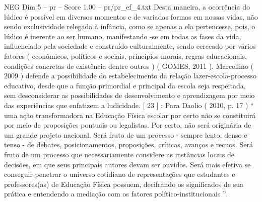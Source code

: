 \begin{textsample}{NEG Dim 5 – pr – Score 1.00 – pr/pr\_ef\_4.txt}
Desta maneira, a ocorrência do lúdico é possível em diversos momentos e de variadas formas em nossas vidas, não sendo exclusividade relegada à infância, como se apenas a ela pertencesse, pois, o lúdico é inerente ao ser humano, manifestando -se em todas as fases da vida, influenciado pela sociedade e construído culturalmente, sendo cerceado por vários fatores ( econômicos, políticos e sociais, princípios morais, regras educacionais, condições concretas de existência dentre outros ) ( GOMES, 2011 ).
Marcellino ( 2009 ) defende a possibilidade do estabelecimento da relação lazer-escola-processo educativo, desde que a função primordial e principal da escola seja respeitada, sem desconsiderar as possibilidades de desenvolvimento e aprendizagem por meio das experiências que enfatizem a ludicidade. [ 23 ] : Para Daolio ( 2010, p. 17 ) “ uma ação transformadora na Educação Física escolar por certo não se constituirá por meio de proposições pontuais ou legalistas.
Por certo, não será originária de um grande projeto nacional.
Será fruto de um processo - sempre lento, denso e tenso - de debates, posicionamentos, proposições, críticas, avanços e recuos.
Será fruto de um processo que necessariamente considere as instâncias locais de decisões, em que seus principais autores devam ser ouvidos.
Será mais efetiva se conseguir penetrar o universo cotidiano de representações que estudantes e professores(as) de Educação Física possuem, decifrando os significados de sua prática e entendendo a mediação com os fatores político-institucionais ”.

\end{textsample}
